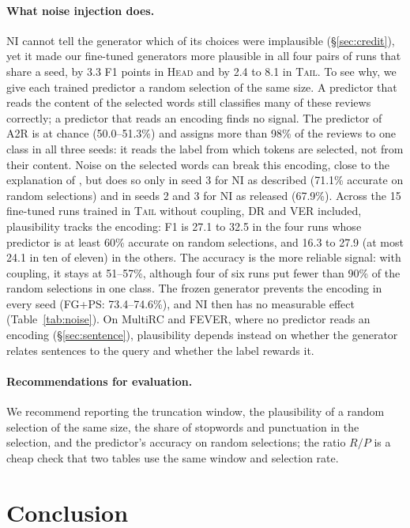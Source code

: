 \documentclass[11pt]{article}
\newcommand{\HEAD}{\textup{\textsc{Head}}}
\newcommand{\TAIL}{\textup{\textsc{Tail}}}
\begin{document}
\paragraph{What noise injection does.}
NI cannot tell the generator which of its choices were implausible (\S\ref{sec:credit}), yet it made our fine-tuned generators more plausible in all four pairs of runs that share a seed, by 3.3 F1 points in \HEAD{} and by 2.4 to 8.1 in \TAIL. To see why, we give each trained predictor a random selection of the same size. A predictor that reads the content of the selected words still classifies many of these reviews correctly; a predictor that reads an encoding finds no signal. The predictor of A2R is at chance (50.0--51.3\%) and assigns more than 98\% of the reviews to one class in all three seeds: it reads the label from which tokens are selected, not from their content. Noise on the selected words can break this encoding, close to the explanation of \citet{storek-etal-2023-unsupervised}, but does so only in seed 3 for NI as described (71.1\% accurate on random selections) and in seeds 2 and 3 for NI as released (67.9\%). Across the 15 fine-tuned runs trained in \TAIL{} without coupling, DR and VER included, plausibility tracks the encoding: F1 is 27.1 to 32.5 in the four runs whose predictor is at least 60\% accurate on random selections, and 16.3 to 27.9 (at most 24.1 in ten of eleven) in the others. The accuracy is the more reliable signal: with coupling, it stays at 51--57\%, although four of six runs put fewer than 90\% of the random selections in one class. The frozen generator prevents the encoding in every seed (FG+PS: 73.4--74.6\%), and NI then has no measurable effect (Table~\ref{tab:noise}). On MultiRC and FEVER, where no predictor reads an encoding (\S\ref{sec:sentence}), plausibility depends instead on whether the generator relates sentences to the query and whether the label rewards it.

\paragraph{Recommendations for evaluation.}
We recommend reporting the truncation window, the plausibility of a random selection of the same size, the share of stopwords and punctuation in the selection, and the predictor's accuracy on random selections; the ratio $R/P$ is a cheap check that two tables use the same window and selection rate.

\section{Conclusion}
\end{document}
